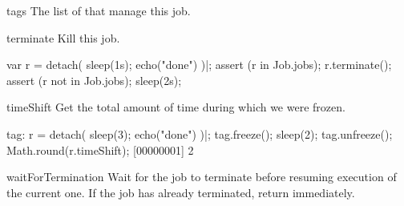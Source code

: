 \begin{urbiscriptapi}
\item[tags] The list of  that manage this job.


\item[terminate]  Kill this job.
\begin{urbiscript}
var r = detach({ sleep(1s); echo("done") })|;
assert (r in Job.jobs);
r.terminate();
assert (r not in Job.jobs);
sleep(2s);
\end{urbiscript}


\item[timeShift]
  Get the total amount of time during which we were frozen.
\begin{urbiscript}
tag: r = detach({ sleep(3); echo("done") })|;
tag.freeze();
sleep(2);
tag.unfreeze();
Math.round(r.timeShift);
[00000001] 2
\end{urbiscript}


\item[waitForTermination] Wait for the job to terminate before resuming
  execution of the current one.  If the job has already terminated, return
  immediately.
\end{urbiscriptapi}


